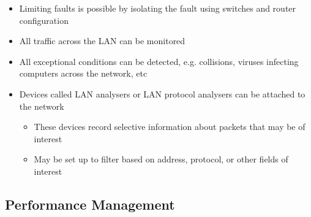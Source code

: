 \begin{itemize}
  \item Limiting faults is possible by isolating the fault using switches and router configuration
  \item All traffic across the LAN can be monitored
  \item All exceptional conditions can be detected, e.g. collisions, viruses infecting computers across the network, etc
  \item Devices called LAN analysers or LAN protocol analysers can be attached to the network
  \begin{itemize}
    \item These devices record selective information about packets that may be of interest
    \item May be set up to filter based on address, protocol, or other fields of interest
  \end{itemize}
\end{itemize}

\subsection*{Performance Management}

